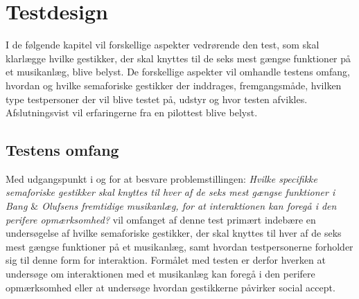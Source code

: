 \chapter{Testdesign}
\label{TestdesignValgAfGestikker}
%
I de følgende kapitel vil forskellige aspekter vedrørende den test, som skal klarlægge hvilke gestikker, der skal knyttes til de seks mest gængse funktioner på et musikanlæg, blive belyst. De forskellige aspekter vil omhandle testens omfang, hvordan og hvilke semaforiske gestikker der inddrages, fremgangsmåde, hvilken type testpersoner der vil blive testet på, udstyr og hvor testen afvikles. Afslutningsvist vil erfaringerne fra en pilottest blive belyst.   
%

\section{Testens omfang}
\label{TestensOmfangValgAfGestikker}
%
Med udgangspunkt i og for at besvare problemstillingen: \textit{Hvilke specifikke semaforiske gestikker skal knyttes til hver af de seks mest gængse funktioner i Bang $\&$ Olufsens fremtidige musikanlæg, for at interaktionen kan foregå i den perifere opmærksomhed?} vil omfanget af denne test primært indebære en undersøgelse af hvilke semaforiske gestikker, der skal knyttes til hver af de seks mest gængse funktioner på et musikanlæg, samt hvordan testpersonerne forholder sig til denne form for interaktion. Formålet med testen er derfor hverken at undersøge om interaktionen med et musikanlæg kan foregå i den perifere opmærksomhed eller at undersøge hvordan gestikkerne påvirker social accept. 


